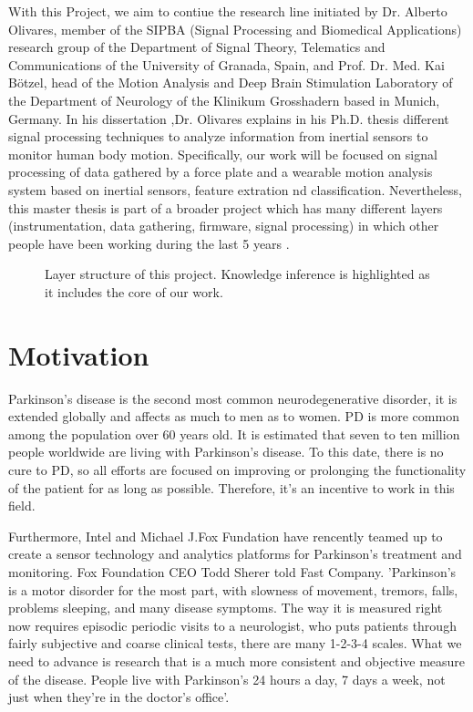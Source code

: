 With this Project, we aim  to contiue the research line initiated by Dr. Alberto Olivares, member of the SIPBA (Signal Processing and Biomedical Applications) research group of the Department of Signal Theory, Telematics and Communications of the University of Granada, Spain, and Prof. Dr. Med. Kai Bötzel, head of the Motion Analysis and Deep Brain Stimulation Laboratory of the Department of Neurology of the Klinikum Grosshadern based in Munich, Germany. In his dissertation ,Dr. Olivares explains in his Ph.D. thesis \cite{A.Olivares2013} different signal processing techniques to analyze information from inertial sensors to monitor human body motion.
Specifically, our work will be focused on signal processing of data gathered  by a force plate and a wearable motion analysis system based on inertial sensors, feature extration nd classification. Nevertheless, this master thesis is part of a broader project which has many different layers (instrumentation, data gathering, firmware, signal processing) in which other people have been working during the last 5 years .

 \begin{figure}[H]
 	\centering
 	\caption{Layer structure of this project. Knowledge inference is highlighted as it includes the core of our work.}
 	\label{fig:layer}
 \end{figure}

\section{Motivation}
Parkinson’s disease is the second most common neurodegenerative disorder, it is extended globally and affects as much to men as to women. PD is more common among the population over 60 years old. It is estimated that seven  to ten million people worldwide are living with Parkinson’s disease. To this date, there is no cure to PD, so all efforts are focused on improving or prolonging the functionality of the patient for as long as possible. Therefore, it’s an incentive to work in this field\cite{ParkinsonDisease}\cite{pdf}. 

Furthermore, Intel and Michael J.Fox Fundation have rencently teamed up to create a sensor technology and analytics platforms for Parkinson’s treatment and monitoring. Fox Foundation CEO Todd Sherer told Fast Company. 'Parkinson’s is a motor disorder for the most part, with slowness of movement, tremors, falls, problems sleeping, and many disease symptoms. The way it is measured right now requires episodic periodic visits to a neurologist, who puts patients through fairly subjective and coarse clinical tests, there are many 1-2-3-4 scales. What we need to advance is research that is a much more consistent and objective measure of the disease. People live with Parkinson’s 24 hours a day, 7 days a week, not just when they're in the doctor’s office'\cite{IntelAndMjf}.

